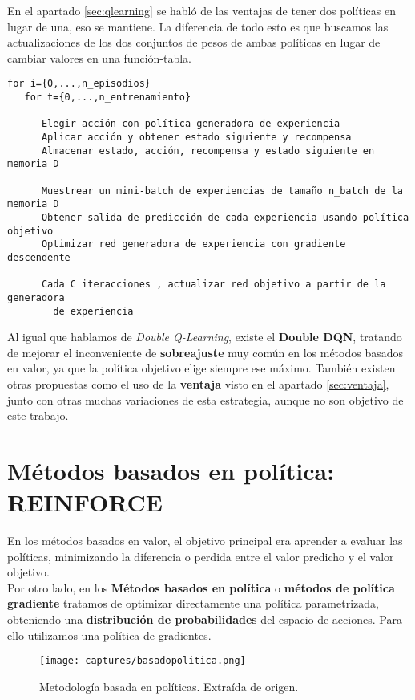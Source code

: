 \documentclass[11pt,fleqn]{book} %
\begin{document}
En el apartado \ref{sec:qlearning} se habló de las ventajas de tener dos políticas en lugar de una, eso se mantiene. La diferencia de todo esto es que buscamos las actualizaciones de los dos conjuntos de pesos de ambas políticas en lugar de cambiar valores en una función-tabla. \\

\begin{verbatim}
for i={0,...,n_episodios}
   for t={0,...,n_entrenamiento}

      Elegir acción con política generadora de experiencia
      Aplicar acción y obtener estado siguiente y recompensa
      Almacenar estado, acción, recompensa y estado siguiente en memoria D

      Muestrear un mini-batch de experiencias de tamaño n_batch de la memoria D
      Obtener salida de predicción de cada experiencia usando política objetivo
      Optimizar red generadora de experiencia con gradiente descendente

      Cada C iteracciones , actualizar red objetivo a partir de la generadora
        de experiencia
\end{verbatim}

Al igual que hablamos de \textit{Double Q-Learning}, existe el \textbf{Double DQN}, tratando de mejorar el inconveniente de \textbf{sobreajuste} muy común en los métodos basados en valor, ya que la política objetivo elige siempre ese máximo. También existen otras propuestas como el uso de la \textbf{ventaja} visto en el apartado \ref{sec:ventaja}, junto con otras muchas variaciones de esta estrategia, aunque no son objetivo de este trabajo.

\section{Métodos basados en política: REINFORCE}

En los métodos basados en valor, el objetivo principal era aprender a evaluar las políticas, minimizando la diferencia o perdida entre el valor predicho y el valor objetivo. \\

Por otro lado, en los \textbf{Métodos basados en política} o \textbf{métodos de política gradiente} tratamos de optimizar directamente una política parametrizada, obteniendo una \textbf{distribución de probabilidades} del espacio de acciones. Para ello utilizamos una política de gradientes. \\

\begin{figure}[H]
	\centering\texttt{[image: captures/basadopolitica.png]}
	\caption{Metodología basada en políticas. Extraída de origen. \cite{article:RLromero}}
	\label{fig:reinforce} %
\end{figure}
\end{document}
